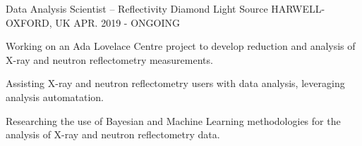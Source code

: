 \begin{cventries}
  \cventry
    {Data Analysis Scientist -- Reflectivity}
    {Diamond Light Source}
    {HARWELL-OXFORD, UK}
    {APR. 2019 - ONGOING}
    {
      \begin{cvitems}
        \item {Working on an Ada Lovelace Centre project to develop reduction and analysis of X-ray and neutron reflectometry measurements.}
        \item {Assisting X-ray and neutron reflectometry users with data analysis, leveraging analysis automatation.}
        \item {Researching the use of Bayesian and Machine Learning methodologies for the analysis of X-ray and neutron reflectometry data.}
      \end{cvitems}
    }
\end{cventries}
